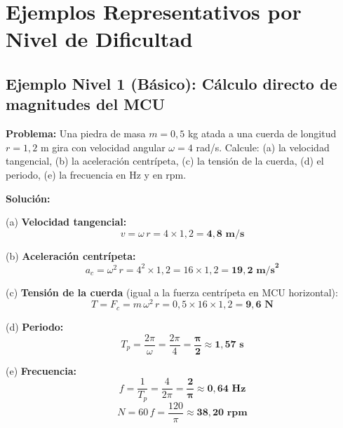 \documentclass[12pt]{article}
\begin{document}
\newpage

\section*{Ejemplos Representativos por Nivel de Dificultad}

\subsection*{Ejemplo Nivel 1 (Básico): Cálculo directo de magnitudes del MCU}

\textbf{Problema:} Una piedra de masa \(m = 0{,}5\) kg atada a una cuerda de longitud \(r = 1{,}2\) m gira con velocidad angular \(\omega = 4\) rad/s. Calcule: (a) la velocidad tangencial, (b) la aceleración centrípeta, (c) la tensión de la cuerda, (d) el periodo, (e) la frecuencia en Hz y en rpm.

\textbf{Solución:}

(a) \textbf{Velocidad tangencial:}
\[
v = \omega\,r = 4 \times 1{,}2 = \mathbf{4{,}8 \text{ m/s}}
\]

(b) \textbf{Aceleración centrípeta:}
\[
a_c = \omega^2\,r = 4^2 \times 1{,}2 = 16 \times 1{,}2 = \mathbf{19{,}2 \text{ m/s}^2}
\]

(c) \textbf{Tensión de la cuerda} (igual a la fuerza centrípeta en MCU horizontal):
\[
T = F_c = m\,\omega^2\,r = 0{,}5 \times 16 \times 1{,}2 = \mathbf{9{,}6 \text{ N}}
\]

(d) \textbf{Periodo:}
\[
T_p = \frac{2\pi}{\omega} = \frac{2\pi}{4} = \mathbf{\frac{\pi}{2} \approx 1{,}57 \text{ s}}
\]

(e) \textbf{Frecuencia:}
\[
f = \frac{1}{T_p} = \frac{4}{2\pi} = \mathbf{\frac{2}{\pi} \approx 0{,}64 \text{ Hz}}
\]
\[
N = 60\,f = \frac{120}{\pi} \approx \mathbf{38{,}20 \text{ rpm}}
\]
\end{document}
